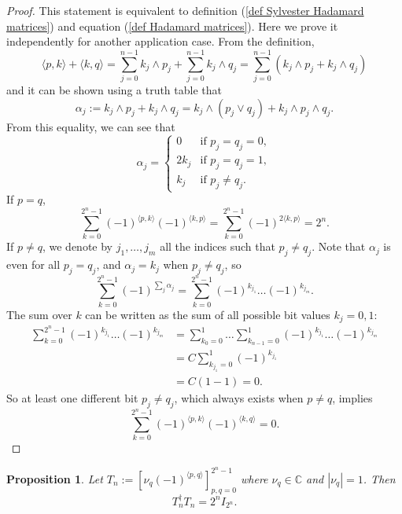 \documentclass{article}
\newtheorem{proposition}[theorem]{Proposition}
\begin{document}
\begin{proof}
    This statement is equivalent to definition (\ref{def Sylvester Hadamard matrices}) and equation (\ref{def Hadamard matrices}). Here we prove it independently for another application case. From the definition,
    $$ \langle p,k \rangle + \langle k,q \rangle = \sum_{j=0}^{n-1} k_j \wedge p_j + \sum_{j=0}^{n-1} k_j \wedge q_j = \sum_{j=0}^{n-1} (k_j \wedge p_j + k_j \wedge q_j) $$
    and it can be shown using a truth table that
    $$ \alpha_j := k_j \wedge p_j + k_j \wedge q_j = k_j \wedge (p_j \vee q_j) + k_j \wedge p_j \wedge q_j. $$
    From this equality, we can see that
    $$ \alpha_j = \begin{cases}
        0 & \text{if } p_j = q_j = 0,\\
        2 k_j & \text{if } p_j = q_j = 1,\\
        k_j & \text{if } p_j \neq q_j.
    \end{cases} $$
    If $p=q$, 
    $$ \sum_{k=0}^{2^n-1} (-1)^{\langle p,k \rangle} (-1)^{\langle k,p \rangle} = \sum_{k=0}^{2^n-1} (-1)^{2 \langle k,p \rangle} = 2^n. $$
    If $p \neq q$, we denote by $j_1, \ldots, j_m$ all the indices such that $p_j \neq q_j$. Note that $\alpha_j$ is even for all $p_j = q_j$, and $\alpha_j = k_j$ when $p_j \neq q_j$, so
    $$ \sum_{k=0}^{2^n-1} (-1)^{\sum_j \alpha_j} = \sum_{k=0}^{2^n-1} (-1)^{k_{j_1}} \ldots (-1)^{k_{j_m}}. $$
    The sum over $k$ can be written as the sum of all possible bit values $k_j = 0,1$:
    $$ \begin{aligned}
        \sum_{k=0}^{2^n-1} (-1)^{k_{j_1}} \ldots (-1)^{k_{j_m}} &= \sum_{k_0 = 0}^1 \ldots \sum_{k_{n-1} = 0}^1 (-1)^{k_{j_1}} \ldots (-1)^{k_{j_m}}\\
        &= C \sum_{k_{j_1} = 0}^1 (-1)^{k_{j_1}}\\
        &= C (1 - 1) = 0.
    \end{aligned} $$
    So at least one different bit $p_j \neq q_j$, which always exists when $p \neq q$, implies
    $$ \sum_{k=0}^{2^n-1} (-1)^{\langle p,k \rangle} (-1)^{\langle k,q \rangle} = 0. $$
\end{proof}
\begin{proposition}
    \label{hadamard-solution matrix def and properties}
    Let $T_n := [\nu_q (-1)^{\langle p,q\rangle}]_{p,q=0}^{2^n-1}$ where $\nu_q \in \mathbb{C}$ and $|\nu_q| = 1$. Then
    $$ T_n^{\dagger} T_n = 2^n I_{2^n}. $$
\end{proposition}
\end{document}
